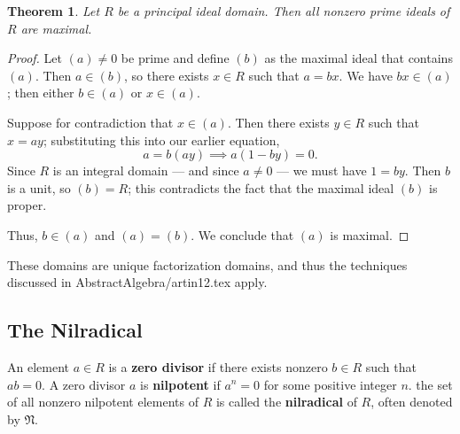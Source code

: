 \documentclass[11pt]{article}
\newtheorem{theorem}{Theorem}
\begin{document}
\begin{adjustwidth}{0.5cm}{}
	\begin{theorem}
		Let $R$ be a principal ideal domain. Then all nonzero prime ideals of $R$ are maximal.
	\end{theorem}
	\begin{proof}
		Let $(a) \ne 0$ be prime and define $(b)$ as the maximal ideal that contains $(a)$. Then $a \in (b)$, so there exists $x \in R$ such that $a = bx$. We have $bx \in (a)$; then either $b \in (a)$ or $x \in (a)$.
		
		Suppose for contradiction that $x \in (a)$. Then there exists $y \in R$ such that $x = ay$; substituting this into our earlier equation,
		\[
			a = b(ay) \implies a(1 - by) = 0.
		\]
		Since $R$ is an integral domain --- and since $a \ne 0$ --- we must have $1 = by$. Then $b$ is a unit, so $(b) = R$; this contradicts the fact that the maximal ideal $(b)$ is proper.

		Thus, $b \in (a)$ and $(a) = (b)$. We conclude that $(a)$ is maximal.
	\end{proof}
\end{adjustwidth}

These domains are unique factorization domains, and thus the techniques discussed in AbstractAlgebra/artin12.tex apply.


\subsection{The Nilradical}

An element $a \in R$ is a \textbf{zero divisor} if there exists nonzero $b \in R$ such that $ab = 0$. A zero divisor $a$ is \textbf{nilpotent} if $a^{n} = 0$ for some positive integer $n$. the set of all nonzero nilpotent elements of $R$ is called the \textbf{nilradical} of $R$, often denoted by $\mathfrak{N}$.
\end{document}
